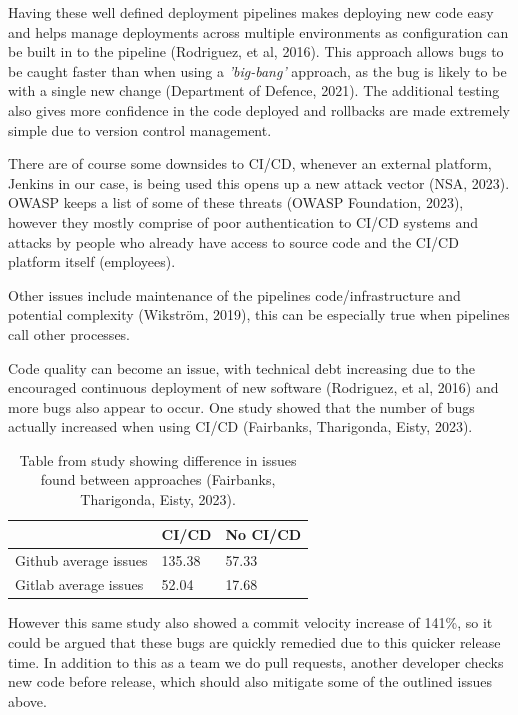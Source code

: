   Having these well defined deployment pipelines makes deploying new code easy and helps manage deployments across multiple environments as configuration 
  can be built in to the pipeline (Rodriguez, et al, 2016). This approach allows bugs to be caught faster than when using 
  a \textit{'big-bang'} approach, as the bug is likely to be with a single new change (Department of Defence, 2021).
  The additional testing also gives more confidence in the code deployed and rollbacks are made extremely simple due to version control management.

  \vspace{0.2cm}

  There are of course some downsides to CI/CD, whenever an external platform, Jenkins in our case, is being used this opens up a new attack vector (NSA, 2023).
  OWASP keeps a list of some of these threats (OWASP Foundation, 2023), however they mostly comprise of poor 
  authentication to CI/CD systems and attacks by people who already have access to source code and the CI/CD platform itself (employees).

  Other issues include maintenance of the pipelines code/infrastructure and potential complexity (Wikström, 2019),
  this can be especially true when pipelines call other processes. 

  Code quality can become an issue, with technical debt increasing due to the encouraged continuous deployment of new software (Rodriguez, et al, 2016) 
  and more bugs also appear to occur. One study showed that the number of bugs actually increased when using CI/CD (Fairbanks, Tharigonda, Eisty, 2023).

  \begin{table}[H]
    \centering
    \begin{tabular}{|p{}|p{}|p{}|}
      \hline
      & CI/CD & No CI/CD \\ \hline
      Github average issues & 135.38 & 57.33 \\ \hline
      Gitlab average issues & 52.04 & 17.68 \\ \hline
    \end{tabular}
    \caption{Table from study showing difference in issues found between approaches (Fairbanks, Tharigonda, Eisty, 2023).}
  \end{table}
  
  However this same study also showed a commit velocity increase of 141\%, so it could be argued that these bugs are quickly remedied due to this quicker 
  release time. In addition to this as a team we do pull requests, another developer checks new code before release, which should also mitigate some 
  of the outlined issues above.

